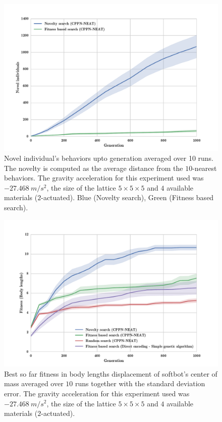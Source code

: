 \begin{figure}
\centering
\includegraphics[width=1.0\textwidth]{../Figures/Results/novelIndividualsFitNovComp.pdf}
\caption{Novel individual's behaviors upto generation averaged over 10 runs. The novelty is computed as the average distance from the $10$-nearest behaviors. The gravity acceleration for this experiment used was $-27.468\   m/s^2$, the size of the lattice $5\times 5\times5$ and $4$ available materials ($2$-actuated). Blue (Novelty search), Green (Fitness based search).}
\label{fig:ViolinPlotsAvgGenFitSize5}
\end{figure}



\begin{figure}
\centering
\includegraphics[width=1.0\textwidth]{../Figures/Results/FitNovRandomDirectSize5.pdf}
\caption{Best so far fitness in body lengths displacement of softbot's center of mass averaged over $10$ runs together with the standard deviation error. The gravity acceleration for this experiment used was $-27.468\   m/s^2$, the size of the lattice $5\times 5\times5$ and $4$ available materials ($2$-actuated).}
\label{fig:FitNovRandomDirectSize5}
\end{figure}

